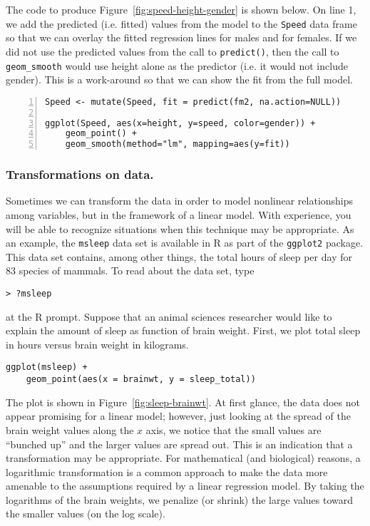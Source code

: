 The code to produce Figure~\ref{fig:speed-height-gender} is shown
below.  On line 1, we add the predicted (i.e. fitted) values from the
model to the \texttt{Speed} data frame so that we can overlay the
fitted regression lines for males and for females.  If we did not use
the predicted values from the call to \texttt{predict()}, then the
call to \texttt{geom\_smooth} would use height alone as the predictor
(i.e. it would not include gender).  This is a work-around so that we
can show the fit from the full model.

\begin{Verbatim}[numbers=left,xleftmargin=5mm,samepage=true]
Speed <- mutate(Speed, fit = predict(fm2, na.action=NULL))

ggplot(Speed, aes(x=height, y=speed, color=gender)) +
    geom_point() +
    geom_smooth(method="lm", mapping=aes(y=fit))
\end{Verbatim}


\subsubsection*{Transformations on data.}

Sometimes we can transform the data in order to model nonlinear
relationships among variables, but in the framework of a linear model.
With experience, you will be able to recognize situations when this
technique may be appropriate. As an example, the \texttt{msleep} data
set is available in R as part of the \texttt{ggplot2} package.  This
data set contains, among other things, the total hours of sleep per
day for 83 species of mammals. To read about the data set, type
\begin{Verbatim}
> ?msleep
\end{Verbatim}
at the R prompt. Suppose that an animal sciences researcher would like
to explain the amount of sleep as function of brain weight. First, we
plot total sleep in hours versus brain weight in kilograms.

\begin{Verbatim}[samepage=true]
ggplot(msleep) +
    geom_point(aes(x = brainwt, y = sleep_total))
\end{Verbatim}

The plot is shown in Figure~\ref{fig:sleep-brainwt}. At first glance, the
data does not appear promising for a linear model; however, just
looking at the spread of the brain weight values along the $x$ axis,
we notice that the small values are ``bunched up'' and the larger
values are spread out.  This is an indication that a transformation
may be appropriate. For mathematical (and biological) reasons, a
logarithmic transformation is a common approach to make the data more amenable
to the assumptions required by a linear regression model.  By taking the
logarithms of the brain weights, we penalize (or shrink) the large values
toward the smaller values (on the log scale). 

